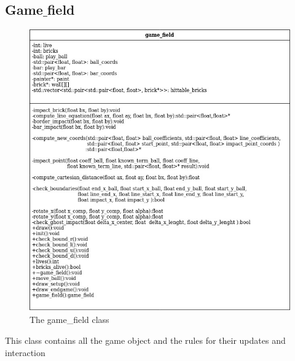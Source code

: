\documentclass[]{article}
\begin{document}
\subsection{Game$\_$field}
\begin{figure}[h!]
    \centering
    \includegraphics[angle=90, scale=0.5]{game_field.jpg}
    \caption{The game\_field class}
    \label{fig:painter game_field diagram }
\end{figure}
This class contains all the game object and the rules for their updates and interaction
\end{document}
